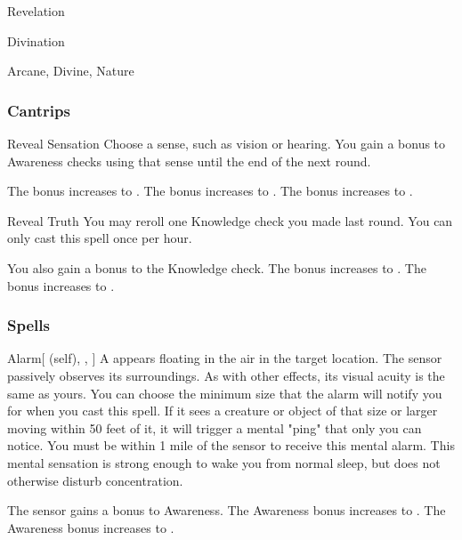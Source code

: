 \newpage
\begin{spellsection}{Revelation}

\begin{spellheader}
\end{spellheader}


 Divination

 Arcane, Divine, Nature

\subsubsection{Cantrips}


\begin{freeability}{Reveal Sensation}
Choose a sense, such as vision or hearing.
You gain a  bonus to Awareness checks using that sense until the end of the next round.

\rankline
{} The bonus increases to .
 The bonus increases to .
 The bonus increases to .
\end{freeability}


\begin{freeability}{Reveal Truth}
You may reroll one Knowledge check you made last round.
You can only cast this spell once per hour.

\rankline
{} You also gain a  bonus to the Knowledge check.
 The bonus increases to .
 The bonus increases to .
\end{freeability}

\end{spellsection}


\subsubsection{Spells}


\lowercase{\hypertarget{spell:Alarm}{}}\label{spell:Alarm}
\begin{attuneability}[Rank 1]{\hypertarget{spell:Alarm}{Alarm}}[ (self), , ]
A  appears floating in the air in the target location.
The sensor passively observes its surroundings.
As with other  effects, its visual acuity is the same as yours.
You can choose the minimum size that the alarm will notify you for when you cast this spell.
If it sees a creature or object of that size or larger moving within 50 feet of it, it will trigger a mental "ping" that only you can notice.
You must be within 1 mile of the sensor to receive this mental alarm.
This mental sensation is strong enough to wake you from normal sleep, but does not otherwise disturb concentration.

\rankline
{} The sensor gains a  bonus to Awareness.
 The Awareness bonus increases to .
 The Awareness bonus increases to .
\end{attuneability}
\vspace{0.25em}




